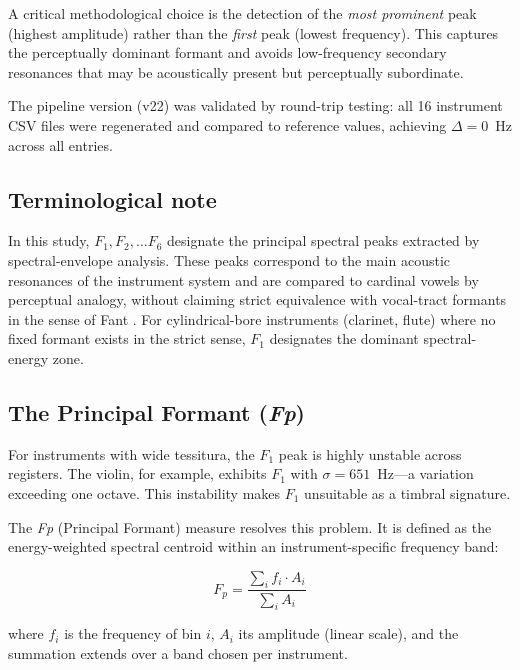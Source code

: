 \documentclass[12pt,a4paper]{article}
\begin{document}
A critical methodological choice is the detection of the \emph{most prominent}
peak (highest amplitude) rather than the \emph{first} peak (lowest frequency).
This captures the perceptually dominant formant and avoids low-frequency
secondary resonances that may be acoustically present but perceptually
subordinate.

The pipeline version (v22) was validated by round-trip testing: all 16 instrument
CSV files were regenerated and compared to reference values, achieving
$\Delta = 0$~Hz across all entries.

\subsection{Terminological note}

In this study, $F_1, F_2, \ldots F_6$ designate the principal spectral peaks
extracted by spectral-envelope analysis. These peaks correspond to the main
acoustic resonances of the instrument system and are compared to cardinal vowels
by perceptual analogy, without claiming strict equivalence with vocal-tract
formants in the sense of Fant \citep{Fant1960}. For cylindrical-bore instruments
(clarinet, flute) where no fixed formant exists in the strict sense, $F_1$
designates the dominant spectral-energy zone.

\subsection{The Principal Formant (\textit{Fp})}
\label{sec:fp}

For instruments with wide tessitura, the $F_1$ peak is highly unstable across
registers. The violin, for example, exhibits $F_1$ with $\sigma = 651$~Hz---a
variation exceeding one octave. This instability makes $F_1$ unsuitable as a
timbral signature.

The \textit{Fp} (Principal Formant) measure resolves this problem. It is defined
as the energy-weighted spectral centroid within an instrument-specific frequency
band:

\begin{equation}
F_p = \frac{\sum_{i} f_i \cdot A_i}{\sum_{i} A_i}
\label{eq:fp}
\end{equation}

\noindent where $f_i$ is the frequency of bin $i$, $A_i$ its amplitude (linear
scale), and the summation extends over a band chosen per instrument.
\end{document}
